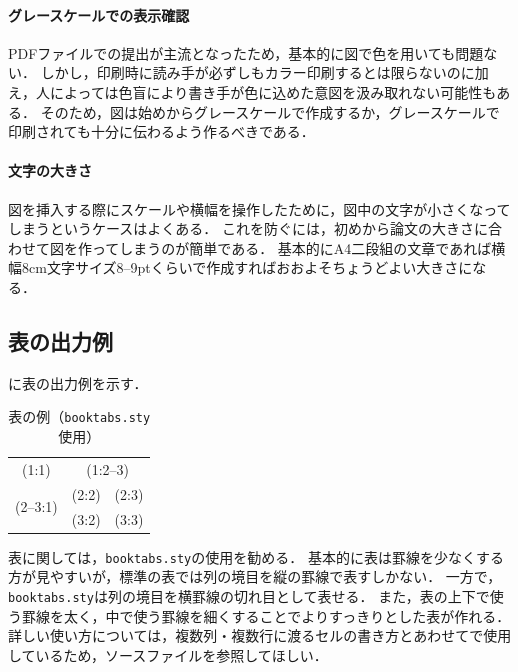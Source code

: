 \paragraph{グレースケールでの表示確認}

PDFファイルでの提出が主流となったため，基本的に図で色を用いても問題ない．
しかし，印刷時に読み手が必ずしもカラー印刷するとは限らないのに加え，人によっては色盲により書き手が色に込めた意図を汲み取れない可能性もある．
そのため，図は始めからグレースケールで作成するか，グレースケールで印刷されても十分に伝わるよう作るべきである．

\paragraph{文字の大きさ}

図を挿入する際にスケールや横幅を操作したために，図中の文字が小さくなってしまうというケースはよくある．
これを防ぐには，初めから論文の大きさに合わせて図を作ってしまうのが簡単である．
基本的にA4二段組の文章であれば横幅8cm文字サイズ8--9ptくらいで作成すればおおよそちょうどよい大きさになる．



\subsection{表の出力例}

\Tab{\ref{tab:sample}}に表の出力例を示す．

\begin{table}[t]
  \caption{表の例（\texttt{booktabs.sty}使用）}
  \label{tab:sample}
  \centering \small
  \begin{tabular}{ccc}
    \toprule
    (1:1)                     & \multicolumn{2}{c}{(1:2--3)}         \\
    \cmidrule(r){1-1}\cmidrule(l){2-3}
    \multirow{2}{*}{(2--3:1)} & (2:2)                        & (2:3) \\
                              & (3:2)                        & (3:3) \\
    \bottomrule
  \end{tabular}
\end{table}

表に関しては，\texttt{booktabs.sty}の使用を勧める．
基本的に表は罫線を少なくする方が見やすいが，{\LaTeXe}標準の表では列の境目を縦の罫線で表すしかない．
一方で，\texttt{booktabs.sty}は列の境目を横罫線の切れ目として表せる．
また，表の上下で使う罫線を太く，中で使う罫線を細くすることでよりすっきりとした表が作れる．
詳しい使い方については，複数列・複数行に渡るセルの書き方とあわせて\Tab{\ref{tab:sample}}で使用しているため，ソースファイルを参照してほしい．



